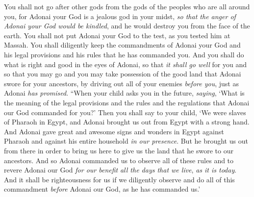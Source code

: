 \begin{biblechapter}
\verse You shall not go after other gods from the gods of the peoples who are all around you,
\verse for Adonai your God is a jealous god in your midst, \textit{so that the anger of Adonai your God would be kindled}, and he would destroy you from the face of the earth.
\verse You shall not put Adonai your God to the test, as you tested him at Massah.
\verse You shall diligently keep the commandments of Adonai your God and his legal provisions and his rules that he has commanded you.
\verse And you shall do what is right and good in the eyes of Adonai, so that \textit{it shall go well} for you and so that you may go and you may take possession of the good land that Adonai swore for your ancestors,
\verse by driving out all of your enemies \textit{before you}, just as Adonai \textit{has promised}.
\verse “When your child asks you in the future, \textit{saying}, ‘What is the meaning of the legal provisions and the rules and the regulations that Adonai our God commanded for you?’
\verse Then you shall say to your child, ‘We were slaves of Pharaoh in Egypt, and Adonai brought us out from Egypt with a strong hand.
\verse And Adonai gave great and awesome signs and wonders in Egypt against Pharaoh and against his entire household \textit{in our presence}.
\verse But he brought us out from there in order to bring us here to give us the land that he swore to our ancestors.
\verse And so Adonai commanded us to observe all of these rules and to revere Adonai our God \textit{for our benefit} \textit{all the days that we live}, \textit{as it is today}.
\verse And it shall be righteousness for us if we diligently observe and do all of this commandment \textit{before} Adonai our God, as he has commanded us.’
\end{biblechapter}

